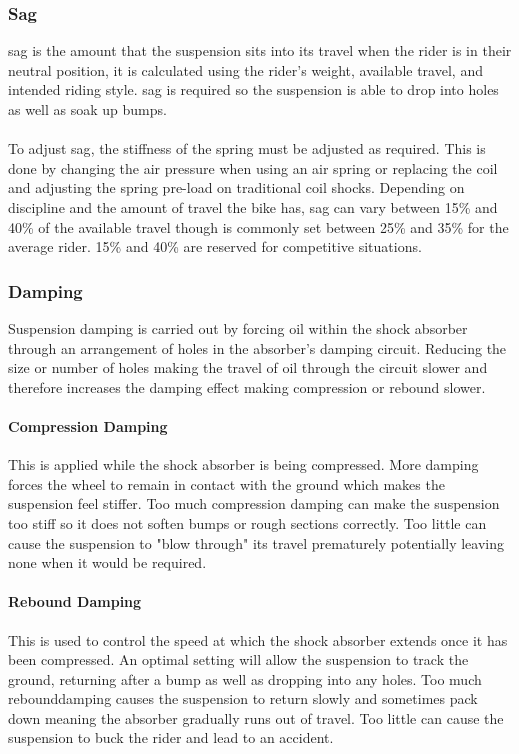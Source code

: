 	\subsubsection{Sag}
		\Gls{sag} is the amount that the suspension sits into its travel when the rider is in their neutral position, it is calculated using the rider's weight, available \gls{travel}, and intended riding style. \Gls{sag} is required so the suspension is able to drop into holes as well as soak up bumps. 
		\\\\
		To adjust \gls{sag}, the stiffness of the spring must be adjusted as required. This is done by changing the air pressure when using an air spring or replacing the coil and adjusting the spring pre-load on traditional coil \glspl{shock}. Depending on discipline and the amount of \gls{travel} the bike has, \gls{sag} can vary between 15\% and 40\% of the available travel though is commonly set between 25\% and 35\% for the average rider. 15\% and 40\% are reserved for competitive situations. 
	\subsubsection{Damping}
		Suspension damping is carried out by forcing oil within the shock absorber through an arrangement of holes in the absorber's damping circuit. Reducing the size or number of holes making the travel of oil through the circuit slower and therefore increases the damping effect making compression or rebound slower.
	\paragraph{Compression Damping} 
		This is applied while the shock absorber is being compressed. More damping forces the wheel to remain in contact with the ground which makes the suspension feel stiffer. Too much compression damping can make the suspension too stiff so it does not soften bumps or rough sections correctly. Too little can cause the suspension to "blow through" its travel prematurely potentially leaving none when it would be required.
	\paragraph{Rebound Damping}
		This is used to control the speed at which the shock absorber extends once it has been compressed. An optimal setting will allow the suspension to track the ground, returning after a bump as well as dropping into any holes. Too much \gls{rebounddamping} causes the suspension to return slowly and sometimes pack down meaning the absorber gradually runs out of travel. Too little can cause the suspension to buck the rider and lead to an accident.
